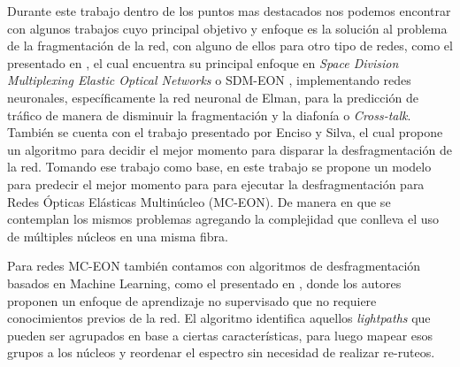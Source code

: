 Durante este trabajo dentro de los puntos mas destacados nos podemos encontrar con algunos trabajos cuyo principal objetivo y enfoque es la solución al problema de la fragmentación de la red, con alguno de ellos para otro tipo de redes, como el presentado en \cite{trindade2020machine}, el cual encuentra su principal enfoque en \textit{Space Division Multiplexing Elastic Optical Networks} o SDM-EON , implementando redes neuronales, específicamente la red neuronal de Elman, para la predicción de tráfico de manera de disminuir la fragmentación y la diafonía o \textit{Cross-talk}.
 También se cuenta con el trabajo presentado por Enciso y Silva, el cual propone un algoritmo para decidir el mejor momento para disparar la desfragmentación de la red. Tomando ese trabajo como base, en este trabajo se propone un modelo para predecir el mejor momento para para ejecutar la desfragmentación para Redes Ópticas Elásticas Multinúcleo (MC-EON). De manera en que se contemplan los mismos problemas agregando la complejidad que conlleva el uso de múltiples núcleos en una misma fibra.
%

Para redes MC-EON también contamos con algoritmos de desfragmentación basados en Machine Learning, como el presentado en \cite{xiong2019machine}, donde los autores proponen un enfoque de aprendizaje no supervisado que no requiere conocimientos previos de la red. El algoritmo identifica aquellos \textit{lightpaths} que pueden ser agrupados en base a ciertas características, para luego mapear esos grupos a los núcleos y reordenar el espectro sin necesidad de realizar re-ruteos.
%

